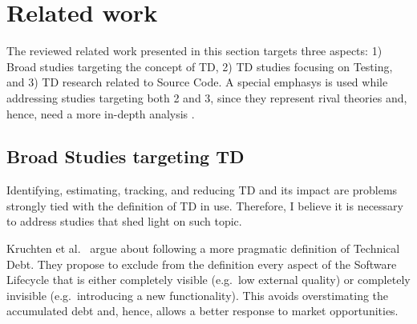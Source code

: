\chapter{Related work}

The reviewed related work presented in this section targets three aspects: 1) Broad studies targeting the concept of TD, 2) TD studies focusing on Testing, and 3) TD research related to Source Code. A special emphasys is used while addressing studies targeting both 2 and 3, since they represent rival theories and, hence, need a more in-depth analysis \cite{case_study_guide}.

\section{Broad Studies targeting TD}
Identifying, estimating, tracking, and reducing TD and its impact are problems strongly tied with the definition of TD in use. Therefore, I believe it is necessary to address studies that shed light on such topic.

Kruchten et al.\ \cite{td_from_debt_to_metaphor} argue about following a more pragmatic definition of Technical Debt. They propose to exclude from the definition every aspect of the Software Lifecycle that is either completely visible (e.g.\ low external quality) or completely invisible (e.g.\ introducing a new functionality). This avoids overstimating the accumulated debt and, hence, allows a better response to market opportunities.

